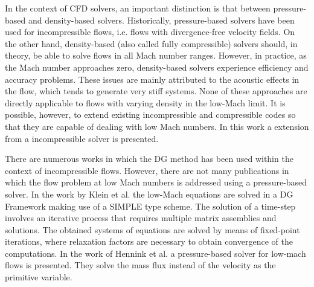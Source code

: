In the context of CFD solvers, an important distinction is that between pressure-based and density-based solvers. Historically, pressure-based solvers have been used for incompressible flows, i.e. flows with divergence-free velocity fields. On the other hand, density-based (also called fully compressible) solvers should, in theory, be able to solve flows in all Mach number ranges. However, in practice, as the Mach number approaches zero, density-based solvers experience efficiency and accuracy problems. These issues are mainly attributed to the acoustic effects in the flow, which tends to generate very stiff systems. None of these approaches are directly applicable to flows with varying density in the low-Mach limit. \cite{henninkPressurebasedSolverLowMach2021} It is possible, however, to extend existing incompressible and compressible codes so that they are capable of dealing with low Mach numbers. \cite{keshtibanCompressibleFlowSolvers2003} In this work a extension from a incompressible solver is presented.

There are numerous works in which the DG method has been used within the context of incompressible flows. \cite{shahbaziHighorderDiscontinuousGalerkin2007,kummerBoSSSDiscontinuousGalerkin2012,kleinSIMPLEBasedDiscontinuous2013,rhebergenSpaceTimeDiscontinuous2013}  However, there are not many publications in which the flow problem at low Mach numbers is addressed using a pressure-based solver. In the work by Klein et al. \cite{kleinHighorderDiscontinuousGalerkin2016} the low-Mach equations are solved in a DG Framework making use of a SIMPLE type scheme. The solution of a time-step involves an iterative process that requires multiple matrix assemblies and solutions. The obtained systems of equations are solved by means of fixed-point iterations, where relaxation factors are necessary to obtain convergence of the computations.
In the work of Hennink et al. \cite{henninkPressurebasedSolverLowMach2021} a pressure-based solver for low-mach flows is presented. They solve  the mass flux instead of the velocity as the primitive variable.

